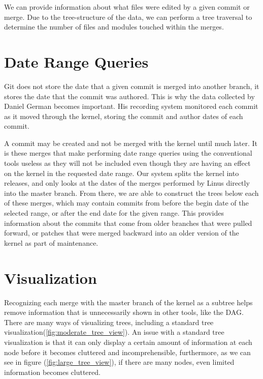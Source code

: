 \documentclass[conference, draftclsnofoot]{IEEEtran}
\begin{document}
We can provide information about what files were edited by a given commit or
merge. Due to the tree-structure of the data, we can perform a tree traversal
to determine the number of files and modules touched within the merges.



\section{Date Range Queries}

Git does not store the date that a given commit is merged into another branch,
it stores the date that the commit was authored. This is why the data collected
by Daniel German becomes important. His recording system monitored each commit
as it moved through the kernel, storing the commit and author dates of each
commit.

A commit may be created and not be merged with the kernel until much later. It
is these merges that make performing date range queries using the conventional
tools useless as they will not be included even though they are having an
effect on the kernel in the requested date range. Our system splits the kernel
into releases, and only looks at the dates of the merges performed by Linus
directly into the master branch. From there, we are able to construct the trees
below each of these merges, which may contain commits from before the begin
date of the selected range, or after the end date for the given range. This
provides information about the commits that come from older branches that were
pulled forward, or patches that were merged backward into an older version of
the kernel as part of maintenance.


\section{Visualization}

Recognizing each merge with the master branch of the kernel as a subtree helps
remove information that is unnecessarily shown in other tools, like the DAG.
There are many ways of visualizing trees, including a standard tree
visualization(\ref{fig:moderate_tree_view}). An issue with a standard tree visualization
is that it can only display a certain amount of information at each node before
it becomes cluttered and incomprehensible, furthermore, as we can see in figure 
(\ref{fig:large_tree_view}), if there are many nodes, even limited information
becomes cluttered.
\end{document}
